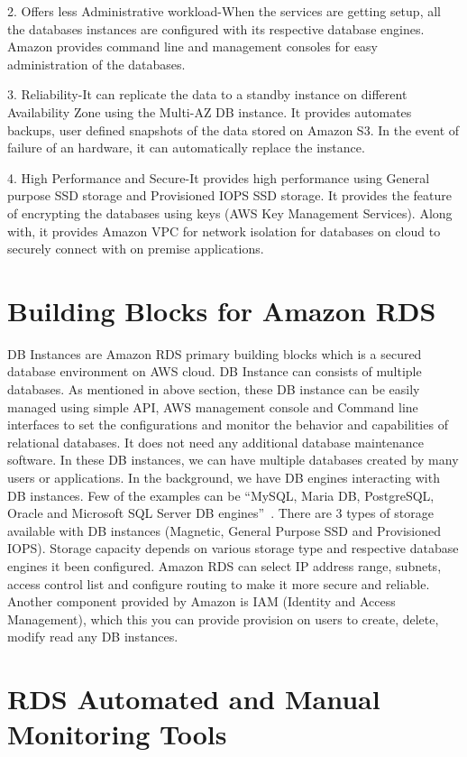 2. Offers less Administrative workload-When the services are getting setup, 
all the databases instances are configured with its respective database engines. 
Amazon provides command line and management consoles for easy administration 
of the databases.

3. Reliability-It can replicate the data to a standby instance on different 
Availability Zone using the Multi-AZ DB instance. It provides  automates 
backups, user defined snapshots of the data stored on Amazon S3. In the event 
of failure of an hardware, it can automatically replace the instance.

4. High Performance and Secure-It provides high performance using General 
purpose SSD storage and Provisioned IOPS SSD storage. It provides the feature 
of encrypting the databases using keys (AWS Key Management Services). 
Along with, it provides Amazon VPC for network isolation for databases on 
cloud to securely connect with on premise applications.
 

\section{Building Blocks for Amazon RDS}

DB Instances are Amazon RDS primary building blocks which is a secured database 
environment on AWS cloud. DB Instance can consists of multiple databases. 
As mentioned in above section, these DB instance can 
be easily managed using simple API, AWS management console and Command line 
interfaces to set the configurations and monitor the behavior and capabilities 
of relational databases. It does not need any additional database maintenance 
software. In these DB instances, we can have multiple databases created by many 
users or 
applications.
In the background, we have DB engines interacting with DB instances. Few of the 
examples can be ``MySQL, Maria DB, PostgreSQL, Oracle and Microsoft SQL Server DB 
engines''~\cite{hid-sp18-520-amazonrds}.
There are 3 types of storage available with DB instances (Magnetic, General 
Purpose SSD and Provisioned IOPS).
Storage capacity depends on various storage type and respective database engines 
it been configured.
Amazon RDS can select IP address range, subnets, access control list and 
configure routing to make it more secure and reliable.
Another component provided by Amazon is IAM (Identity and Access Management), 
which this you can provide provision on users to create, delete, modify read 
any DB instances.

\section{RDS Automated and Manual Monitoring Tools}

